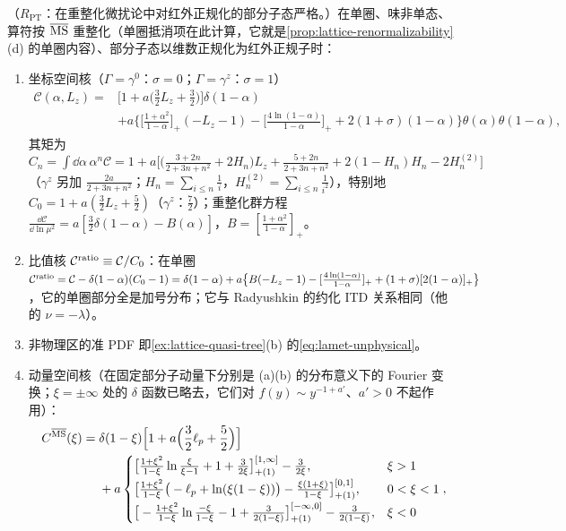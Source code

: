 \begin{proposition}\label{prop:lamet-oneloop}
（$R_{\mathrm{PT}}$：在重整化微扰论中对红外正规化的部分子态严格。）在单圈、味非单态、算符按 $\overline{\mathrm{MS}}$ 重整化（单圈抵消项在此计算，它就是\cref{prop:lattice-renormalizability}(d) 的单圈内容）、部分子态以维数正规化为红外正规子时：
\begin{enumerate}[label=(\alph*),leftmargin=2em,itemsep=2pt,topsep=2pt]
\item 坐标空间核（$\Gamma=\gamma^0$：$\sigma=0$；$\Gamma=\gamma^z$：$\sigma=1$）
\begin{equation}\label{eq:lamet-coord-kernel}
\begin{split}
\mathcal C(\alpha,L_z)={}&\Big[1+a\Big(\frac32L_z+\frac32\Big)\Big]\delta(1-\alpha)\\
&+a\Big\{\Big[\frac{1+\alpha^2}{1-\alpha}\Big]_+(-L_z-1)-\Big[\frac{4\ln(1-\alpha)}{1-\alpha}\Big]_++2(1+\sigma)(1-\alpha)\Big\}\theta(\alpha)\theta(1-\alpha),
\end{split}
\end{equation}%
其矩为 $C_n=\int\dd\alpha\,\alpha^n\mathcal C=1+a\big[\big(\frac{3+2n}{2+3n+n^2}+2H_n\big)L_z+\frac{5+2n}{2+3n+n^2}+2(1-H_n)H_n-2H^{(2)}_n\big]$（$\gamma^z$ 另加 $\frac{2a}{2+3n+n^2}$；$H_n=\sum_{i\le n}\frac1i$，$H^{(2)}_n=\sum_{i\le n}\frac1{i^2}$），特别地 $C_0=1+a(\frac32L_z+\frac52)$（$\gamma^z$：$\frac72$）；重整化群方程 $\frac{\dd\mathcal C}{\dd\ln\mu^2}=a[\frac32\delta(1-\alpha)-B(\alpha)]$，$B=[\frac{1+\alpha^2}{1-\alpha}]_+$。
\item 比值核 $\mathcal C^{\rm ratio}\equiv\mathcal C/C_0$：在单圈 $\mathcal C^{\rm ratio}=\mathcal C-\delta(1-\alpha)(C_0-1)=\delta(1-\alpha)+a\big\{B(-L_z-1)-[\frac{4\ln(1-\alpha)}{1-\alpha}]_++(1+\sigma)[2(1-\alpha)]_+\big\}$，它的单圈部分全是加号分布；它与 Radyushkin 的约化 ITD 关系相同（他的 $\nu=-\lambda$）。%
\item 非物理区的准 PDF 即\cref{ex:lattice-quasi-tree}(b) 的\cref{eq:lamet-unphysical}。
\item 动量空间核（在固定部分子动量下分别是 (a)(b) 的分布意义下的 Fourier 变换；$\xi=\pm\infty$ 处的 $\delta$ 函数已略去，它们对 $f(y)\sim y^{-1+a'}$、$a'>0$ 不起作用）：
\begin{equation}\label{eq:lamet-CMS}
\begin{split}
C^{\MSbar}(\xi)={}&\delta(1-\xi)\Big[1+a\Big(\frac32\ell_p+\frac52\Big)\Big]\\
&+a\begin{cases}\big[\frac{1+\xi^2}{1-\xi}\ln\frac\xi{\xi-1}+1+\frac3{2\xi}\big]^{[1,\infty]}_{+(1)}-\frac3{2\xi},&\xi>1\\[3pt]\big[\frac{1+\xi^2}{1-\xi}\big(-\ell_p+\ln(\xi(1-\xi))\big)-\frac{\xi(1+\xi)}{1-\xi}\big]^{[0,1]}_{+(1)},&0<\xi<1\\[3pt]\big[-\frac{1+\xi^2}{1-\xi}\ln\frac{-\xi}{1-\xi}-1+\frac3{2(1-\xi)}\big]^{[-\infty,0]}_{+(1)}-\frac3{2(1-\xi)},&\xi<0\end{cases},

\end{split}
\end{equation}
\end{enumerate}
\end{proposition}
